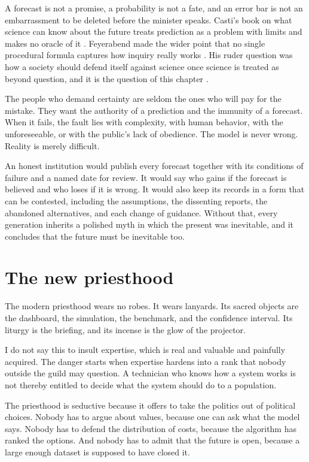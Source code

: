 \documentclass[12pt,a4paper]{book}
\begin{document}
A forecast is not a promise, a probability is not a fate, and an error bar is not an embarrassment to be deleted before the minister speaks. Casti's book on what science can know about the future treats prediction as a problem with limits and makes no oracle of it \cite{casti:92a}. Feyerabend made the wider point that no single procedural formula captures how inquiry really works \cite{Feyerabend2001May}. His ruder question was how a society should defend itself against science once science is treated as beyond question, and it is the question of this chapter \cite{feyerabend-defense}.

The people who demand certainty are seldom the ones who will pay for the mistake. They want the authority of a prediction and the immunity of a forecast. When it fails, the fault lies with complexity, with human behavior, with the unforeseeable, or with the public's lack of obedience. The model is never wrong. Reality is merely difficult.

An honest institution would publish every forecast together with its conditions of failure and a named date for review. It would say who gains if the forecast is believed and who loses if it is wrong. It would also keep its records in a form that can be contested, including the assumptions, the dissenting reports, the abandoned alternatives, and each change of guidance. Without that, every generation inherits a polished myth in which the present was inevitable, and it concludes that the future must be inevitable too.

\section{The new priesthood}

The modern priesthood wears no robes. It wears lanyards. Its sacred objects are the dashboard, the simulation, the benchmark, and the confidence interval. Its liturgy is the briefing, and its incense is the glow of the projector.

I do not say this to insult expertise, which is real and valuable and painfully acquired. The danger starts when expertise hardens into a rank that nobody outside the guild may question. A technician who knows how a system works is not thereby entitled to decide what the system should do to a population.

The priesthood is seductive because it offers to take the politics out of political choices. Nobody has to argue about values, because one can ask what the model says. Nobody has to defend the distribution of costs, because the algorithm has ranked the options. And nobody has to admit that the future is open, because a large enough dataset is supposed to have closed it.
\end{document}
